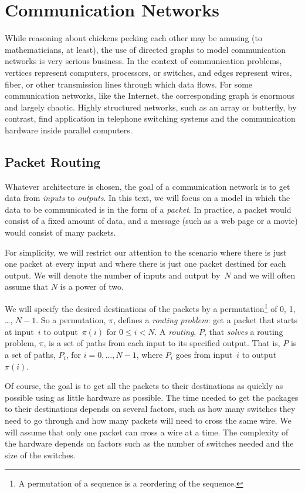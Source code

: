 \section{Communication Networks}\label{sec:comm_nets}

While reasoning about chickens pecking each other may be amusing (to
mathematicians, at least), the use of directed graphs to model
communication networks is very serious business.  In the context of
communication problems, vertices represent computers, processors, or
switches, and edges represent wires, fiber, or other transmission
lines through which data flows.  For some communication networks, like
the Internet, the corresponding graph is enormous and largely chaotic.
Highly structured networks, such as an array or butterfly, by
contrast, find application in telephone switching systems and the
communication hardware inside parallel computers.

\subsection{Packet Routing}

Whatever architecture is chosen, the goal of a communication network
is to get data from \emph{inputs} to \emph{outputs}.  In this text, we
will focus on a model in which the data to be communicated is in the
form of a \emph{packet}.  In practice, a packet would consist of a
fixed amount of data, and a message (such as a web page or a movie)
would consist of many packets.

For simplicity, we will restrict our attention to the scenario where
there is just one packet at every input and where there is just one
packet destined for each output.  We will denote the number of inputs
and output by~$N$ and we will often assume that $N$ is a power of two.

We will specify the desired destinations of the packets by a
permutation\footnote{A permutation of a sequence is a reordering of
  the sequence.} of 0, 1, \dots, $N - 1$.  So a permutation, $\pi$,
defines a \emph{routing problem}: get a packet that starts at
input~$i$ to output~$\pi(i)$ for $0 \le i < N$.  A \emph{routing},
$P$, that \emph{solves} a routing problem, $\pi$, is a set of paths
from each input to its specified output.  That is, $P$ is a set of
paths, $P_i$, for $i = 0, \dots, N - 1$, where $P_i$ goes from
input~$i$ to output~$\pi(i)$.

Of course, the goal is to get all the packets to their destinations as
quickly as possible using as little hardware as possible.  The time
needed to get the packages to their destinations depends on several
factors, such as how many switches they need to go through and how
many packets will need to cross the same wire.  We will assume that
only one packet can cross a wire at a time.  The complexity of the
hardware depends on factors such as the number of switches needed and
the size of the switches.

